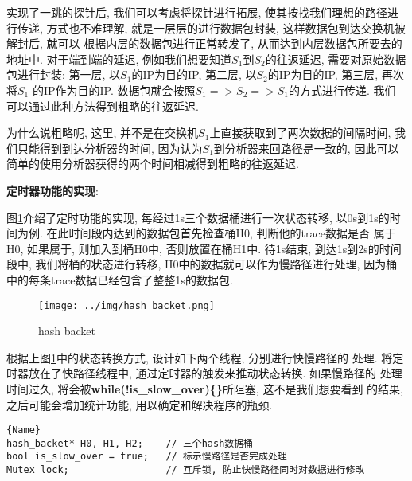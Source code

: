 实现了一跳的探针后, 我们可以考虑将探针进行拓展,
使其按找我们理想的路径进行传递, 方式也不难理解,
就是一层层的进行数据包封装, 这样数据包到达交换机被解封后, 就可以
根据内层的数据包进行正常转发了, 从而达到内层数据包所要去的地址中.
对于端到端的延迟, 例如我们想要知道\(S_{1}\)到\(S_{2}\)的往返延迟,
需要对原始数据包进行封装: 第一层, 以\(S_{1}\)的IP为目的IP, 第二层,
以\(S_{2}\)的IP为目的IP, 第三层, 再次将\(S_{1}\) 的IP作为目的IP.
数据包就会按照\(S_{1} => S_{2} => S_{1}\)的方式进行传递. 我们
可以通过此种方法得到粗略的往返延迟.

为什么说粗略呢, 这里,
并不是在交换机\(S_{1}\)上直接获取到了两次数据的间隔时间,
我们只能得到到达分析器的时间, 因为认为\(S_{1}\)到分析器来回路径是一致的,
因此可以 简单的使用分析器获得的两个时间相减得到粗略的往返延迟.


\textbf{定时器功能的实现}:

图\ref{fig:hash_backet}介绍了定时功能的实现, 每经过1s三个数据桶进行一次状态转移,
以0s到1s的时间为例. 在此时间段内达到的数据包首先检查桶H0, 判断他的trace数据是否
属于H0, 如果属于, 则加入到桶H0中, 否则放置在桶H1中. 待1s结束, 到达1s到2s的时间段中,
我们将桶的状态进行转移, H0中的数据就可以作为慢路径进行处理,
因为桶中的每条trace数据已经包含了整整1s的数据包.

\begin{center}
\end{center}

\begin{figure}[htbp!]
  \centering 
  \texttt{[image: ../img/hash\_backet.png]}
  \caption{hash backet}
  \label{fig:hash_backet}
\end{figure}


  根据上图\ref{fig:hash_backet}中的状态转换方式, 设计如下两个线程, 分别进行快慢路径的
处理. 将定时器放在了快路径线程中, 通过定时器的触发来推动状态转换. 如果慢路径的
处理时间过久, 将会被\textbf{while(!is\_slow\_over)\{\}}所阻塞, 这不是我们想要看到
的结果, 之后可能会增加统计功能, 用以确定和解决程序的瓶颈.

\begin{lstlisting}[caption=数据结构,frame=tlrb]{Name}
hash_backet* H0, H1, H2;    // 三个hash数据桶
bool is_slow_over = true;   // 标示慢路径是否完成处理
Mutex lock;                 // 互斥锁, 防止快慢路径同时对数据进行修改

\end{lstlisting}

